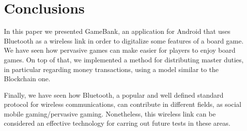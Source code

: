 \section*{Conclusions}
\label{conclusions}

In this paper we presented GameBank, an application for Android that uses 
Bluetooth as a wireless link in order to digitalize some features of a board 
game. We have seen how pervasive games can make easier for players to enjoy 
board games. On top of that, we implemented a method for distributing master 
duties, in particular regarding money transactions, using a model similar to 
the Blockchain one.

Finally, we have seen how Bluetooth, a popular and well defined standard 
protocol for wireless communications, can contribute in different fields, as 
social mobile gaming/pervasive gaming. Nonetheless, this wireless link can be 
considered an effective technology for carring out future tests in these areas.